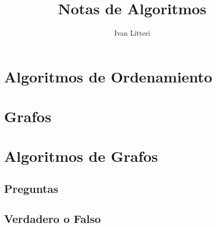 \documentclass{article}
\title{Notas de Algoritmos}
\author{Ivan Litteri}
\date{}
\begin{document}
\maketitle
\lstset{language=Python}

% 

\section*{Algoritmos de Ordenamiento}



\section*{Grafos}


\section*{Algoritmos de Grafos}


\subsection*{Preguntas}


\subsection*{Verdadero o Falso}

\end{document}
